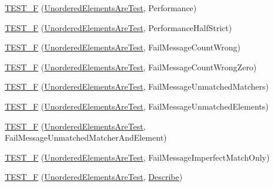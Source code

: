 \begin{DoxyCompactItemize}
\hyperlink{namespacetesting_1_1gmock__matchers__test_a074ca2babea203d1a54d69ff1fde5c59}{T\+E\+S\+T\+\_\+F} (\hyperlink{classtesting_1_1gmock__matchers__test_1_1_unordered_elements_are_test}{Unordered\+Elements\+Are\+Test}, Performance)
\item 
\hyperlink{namespacetesting_1_1gmock__matchers__test_a4437de9d40efd87f73b738ef38c2d70f}{T\+E\+S\+T\+\_\+F} (\hyperlink{classtesting_1_1gmock__matchers__test_1_1_unordered_elements_are_test}{Unordered\+Elements\+Are\+Test}, Performance\+Half\+Strict)
\item 
\hyperlink{namespacetesting_1_1gmock__matchers__test_a5dd3b28b540c1ef01e623f840c48e7b4}{T\+E\+S\+T\+\_\+F} (\hyperlink{classtesting_1_1gmock__matchers__test_1_1_unordered_elements_are_test}{Unordered\+Elements\+Are\+Test}, Fail\+Message\+Count\+Wrong)
\item 
\hyperlink{namespacetesting_1_1gmock__matchers__test_a7dc8c467fe0d6f26c0ee643be56eb590}{T\+E\+S\+T\+\_\+F} (\hyperlink{classtesting_1_1gmock__matchers__test_1_1_unordered_elements_are_test}{Unordered\+Elements\+Are\+Test}, Fail\+Message\+Count\+Wrong\+Zero)
\item 
\hyperlink{namespacetesting_1_1gmock__matchers__test_a11b785087491ae58b074fa8dbbc88cd4}{T\+E\+S\+T\+\_\+F} (\hyperlink{classtesting_1_1gmock__matchers__test_1_1_unordered_elements_are_test}{Unordered\+Elements\+Are\+Test}, Fail\+Message\+Unmatched\+Matchers)
\item 
\hyperlink{namespacetesting_1_1gmock__matchers__test_a6dfb50dcbb543de71fcc4d09844d36b3}{T\+E\+S\+T\+\_\+F} (\hyperlink{classtesting_1_1gmock__matchers__test_1_1_unordered_elements_are_test}{Unordered\+Elements\+Are\+Test}, Fail\+Message\+Unmatched\+Elements)
\item 
\hyperlink{namespacetesting_1_1gmock__matchers__test_a2395b7e71b7ad50af72caa61c10e6898}{T\+E\+S\+T\+\_\+F} (\hyperlink{classtesting_1_1gmock__matchers__test_1_1_unordered_elements_are_test}{Unordered\+Elements\+Are\+Test}, Fail\+Message\+Unmatched\+Matcher\+And\+Element)
\item 
\hyperlink{namespacetesting_1_1gmock__matchers__test_ac70f9f9717f35352349b076654094f6a}{T\+E\+S\+T\+\_\+F} (\hyperlink{classtesting_1_1gmock__matchers__test_1_1_unordered_elements_are_test}{Unordered\+Elements\+Are\+Test}, Fail\+Message\+Imperfect\+Match\+Only)
\item 
\hyperlink{namespacetesting_1_1gmock__matchers__test_a937f4d835023cd6322eb7d32596f3f43}{T\+E\+S\+T\+\_\+F} (\hyperlink{classtesting_1_1gmock__matchers__test_1_1_unordered_elements_are_test}{Unordered\+Elements\+Are\+Test}, \hyperlink{namespacetesting_1_1gmock__matchers__test_a36ae44e4f6c8e9fe3fe9162132503717}{Describe})

\end{DoxyCompactItemize}
